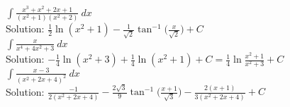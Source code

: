 \documentclass[11pt]{report}
\begin{document}
$\displaystyle \int \frac{x^3+x^2+2x+1}{(x^2+1)(x^2+2)}~dx$\\

Solution: $\displaystyle \frac{1}{2} \ln (x^2+1) - \frac{1}{\sqrt 2}\tan^{-1} \biggl(\frac{x}{\sqrt 2}\biggr) + C$\\



$\displaystyle \int \frac{x}{x^4+4x^2+3}~dx$\\

Solution: $\displaystyle -\frac{1}{4} \ln (x^2+3) + \frac{1}{4} \ln (x^2+1) + C =  \frac{1}{4} \ln  \frac{x^2+1}{x^2+3} + C$\\


$\displaystyle \int \frac{x-3}{(x^2+2x+4)^2}~dx$\\

Solution: $\displaystyle \frac{-1}{2(x^2+2x+4)} - \frac{2\sqrt 3}{9} \tan^{-1} 
\biggl(\frac{x+1}{\sqrt 3}\biggr) -\frac{2(x+1)}{3(x^2+2x+4)} + C$\\
\end{document}
